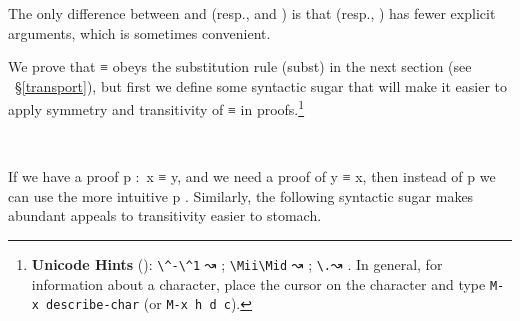 The only difference between  and  (resp.,  and ) is that  (resp., ) has fewer explicit arguments, which is sometimes convenient.

We prove that \ad ≡ obeys the substitution rule (subst) in the next section (see ~\S\ref{transport}), but first we define some syntactic sugar that will make it easier to apply symmetry and transitivity of \ad ≡ in proofs.\footnote{%
\textbf{Unicode Hints} (\agdamode): \texttt{\textbackslash{}\^{}-\textbackslash{}\^{}1} ↝ ; \texttt{\textbackslash{}Mii\textbackslash{}Mid} ↝ ; \texttt{\textbackslash{}.}↝ . In general, for information about a character, place the cursor on the character and type \texttt{M-x\ describe-char} (or \texttt{M-x\ h\ d\ c}).}
\ccpad
\begin{code}
\>[1]\AgdaSpace{}%
\AgdaSymbol{:}\AgdaSpace{}%
\AgdaSymbol{\{}\AgdaSpace{}%
\AgdaSpace{}%
\AgdaSymbol{:}\AgdaSpace{}%
\AgdaSymbol{\}}\AgdaSpace{}%
\AgdaSpace{}%
\AgdaSpace{}%
\AgdaSpace{}%
\AgdaSpace{}%
\AgdaSpace{}%
\AgdaSpace{}%
\AgdaSpace{}%
\<%
\\
%
\>[1]\AgdaSpace{}%
\AgdaSpace{}%
\AgdaSymbol{=}\AgdaSpace{}%
\AgdaSpace{}%
\<%
\end{code}
\ccpad
If we have a proof \ab p \as :~\ab x \aod ≡ \ab y, and we need a proof of \ab y \aod ≡ \ab x, then instead of  \ab p we can use the more intuitive \ab p . Similarly, the following syntactic sugar makes abundant appeals to transitivity easier to stomach.
\ccpad
